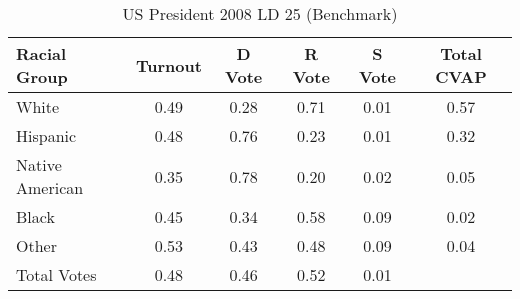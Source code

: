 \begin{table}[htb]
\begin{center}
\caption{US President 2008 LD 25 (Benchmark)}
\label{pres08_cvap_ld_25_benchmark}
\begin{tabular}{lccccc}
  \hline
Racial Group & Turnout & D Vote & R Vote & S Vote & Total CVAP \\ 
  \hline
White & 0.49 & 0.28 & 0.71 & 0.01 & 0.57 \\ 
  Hispanic & 0.48 & 0.76 & 0.23 & 0.01 & 0.32 \\ 
  Native American & 0.35 & 0.78 & 0.20 & 0.02 & 0.05 \\ 
  Black & 0.45 & 0.34 & 0.58 & 0.09 & 0.02 \\ 
  Other & 0.53 & 0.43 & 0.48 & 0.09 & 0.04 \\ 
  Total Votes & 0.48 & 0.46 & 0.52 & 0.01 &  \\ 
   \hline
\end{tabular}
\end{center}
\end{table}
